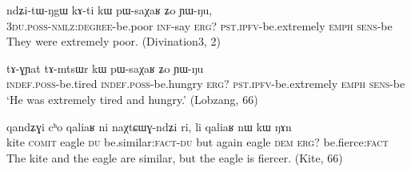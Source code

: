 \documentclass[oldfontcommands,oneside,a4paper,11pt]{article}
\newcommand{\ipa}[1]{{\phon #1}} %
\begin{document}
           \begin{exe}
  \ex  \label{ex:kW.pWsaXaR2}  
  \gll 
  \ipa{ndʑi-tɯ-ŋgɯ}  	\ipa{kɤ-ti}  	\ipa{kɯ}  	\ipa{pɯ-saχaʁ}  	\ipa{ʑo}  	\ipa{ɲɯ-ŋu,}  \\
  \textsc{3du.poss-nmlz:degree}-be.poor \textsc{inf}-say \textsc{erg?} \textsc{pst.ipfv}-be.extremely \textsc{emph} \textsc{sens}-be \\
  \glt They were extremely poor. (Divination3, 2)
   \end{exe}   
   
   
         \begin{exe}
  \ex  \label{ex:kW.pWsaXaR}  
  \gll 
   \ipa{tɤ-ɣɲat}  	\ipa{tɤ-mtsɯr}  	\ipa{kɯ}  	\ipa{pɯ-saχaʁ}  	\ipa{ʑo}  	\ipa{ɲɯ-ŋu}  \\
      \textsc{indef.poss}-be.tired     \textsc{indef.poss}-be.hungry \textsc{erg?} \textsc{pst.ipfv}-be.extremely \textsc{emph} \textsc{sens}-be \\ 
      \glt `He was extremely tired and hungry.' (Lobzang, 66)
   \end{exe}   
  
   \begin{exe}
  \ex  \label{ex:kW.NAn}  
  \gll 
\ipa{qandʑɣi}  	\ipa{cʰo}  	\ipa{qaliaʁ}  	\ipa{ni}  	\ipa{naχtɕɯɣ-ndʑi}  	\ipa{ri,}  	\ipa{li}  	\ipa{qaliaʁ}  	\ipa{nɯ}  	\ipa{kɯ}  	\ipa{ŋɤn}     \\
kite \textsc{comit} eagle \textsc{du} be.similar:\textsc{fact}-\textsc{du} but again eagle \textsc{dem} \textsc{erg}? be.fierce:\textsc{fact} \\
\glt The kite and the eagle are similar, but the eagle is fiercer. (Kite, 66)
     \end{exe}   
\end{document}
